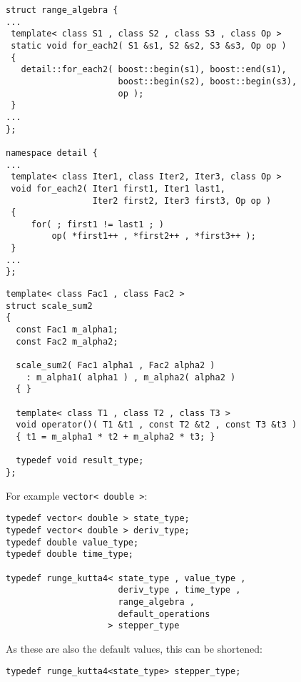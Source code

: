 \begin{frame}[fragile]

\begin{lstlisting}[basicstyle=\scriptsize\ttfamily]
struct range_algebra {
...
 template< class S1 , class S2 , class S3 , class Op >
 static void for_each2( S1 &s1, S2 &s2, S3 &s3, Op op )
 {
   detail::for_each2( boost::begin(s1), boost::end(s1),
                      boost::begin(s2), boost::begin(s3), 
                      op );
 }
...
};

namespace detail {
...
 template< class Iter1, class Iter2, Iter3, class Op >
 void for_each2( Iter1 first1, Iter1 last1, 
                 Iter2 first2, Iter3 first3, Op op )
 {
     for( ; first1 != last1 ; )
         op( *first1++ , *first2++ , *first3++ );
 }
...
};
\end{lstlisting}

\end{frame}


\begin{frame}[fragile]
\begin{lstlisting}
template< class Fac1 , class Fac2 >
struct scale_sum2
{
  const Fac1 m_alpha1;
  const Fac2 m_alpha2;

  scale_sum2( Fac1 alpha1 , Fac2 alpha2 ) 
    : m_alpha1( alpha1 ) , m_alpha2( alpha2 ) 
  { }

  template< class T1 , class T2 , class T3 >
  void operator()( T1 &t1 , const T2 &t2 , const T3 &t3 )
  { t1 = m_alpha1 * t2 + m_alpha2 * t3; }

  typedef void result_type;
};
\end{lstlisting}

\end{frame}

\begin{frame}[fragile]


For example \lstinline+vector< double >+:
\begin{lstlisting}
typedef vector< double > state_type;
typedef vector< double > deriv_type;
typedef double value_type;
typedef double time_type;

typedef runge_kutta4< state_type , value_type , 
                      deriv_type , time_type , 
                      range_algebra , 
                      default_operations 
                    > stepper_type
\end{lstlisting}

\vspace{1em}
As these are also the default values, this can be shortened:
\begin{lstlisting}
typedef runge_kutta4<state_type> stepper_type; 
\end{lstlisting}

\end{frame}


